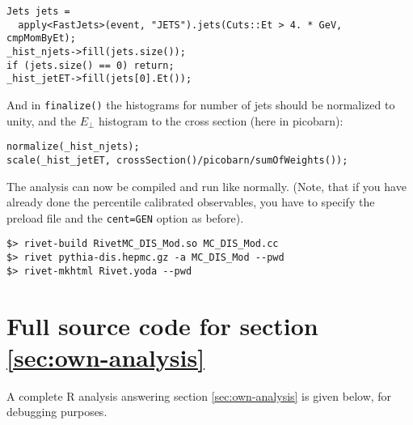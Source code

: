 \documentclass[11pt]{article}
\newcommand{\rivet}{R\protect\scalebox{0.8}{IVET}\xspace}
\begin{document}
\begin{verbatim}
Jets jets = 
  apply<FastJets>(event, "JETS").jets(Cuts::Et > 4. * GeV, cmpMomByEt);
_hist_njets->fill(jets.size());
if (jets.size() == 0) return;
_hist_jetET->fill(jets[0].Et());
\end{verbatim}

And in \texttt{finalize()} the histograms for number of jets should be normalized to unity, and the $E_\perp$ histogram to the cross section (here in picobarn):

\begin{verbatim}
normalize(_hist_njets);
scale(_hist_jetET, crossSection()/picobarn/sumOfWeights());
\end{verbatim}

The analysis can now be compiled and run like normally. (Note, that if you have already done the percentile calibrated observables, you have to specify the preload file and the \texttt{cent=GEN} option as before).

\begin{verbatim}
$> rivet-build RivetMC_DIS_Mod.so MC_DIS_Mod.cc
$> rivet pythia-dis.hepmc.gz -a MC_DIS_Mod --pwd
$> rivet-mkhtml Rivet.yoda --pwd
\end{verbatim}

  
 

\appendix
\section{Full source code for section \ref{sec:own-analysis}}
\label{app:code}
A complete \rivet analysis answering section \ref{sec:own-analysis} is given below, for debugging purposes.
\end{document}
